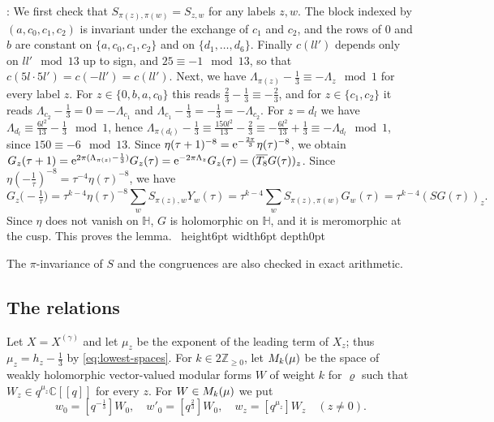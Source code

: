 \documentclass[leqno]{article}
\newcommand{\Cbb}{\ensuremath{\mathbb{C}}}
\let\cal\relax
\newcommand{\cal}{\mathcal}
\newcommand{\Z}{\ensuremath{\mathbb{Z}}}
\renewcommand{\geq}{\ensuremath{\geqslant}}
\newcommand{\qed}{\hfill \vrule height6pt  width6pt depth0pt}
\newcommand{\ovl}{\overline}
\let\i\relax
\newcommand{\i}{\mathrm{i}}
\newcommand{\e}{\mathrm{e}}
\newenvironment{proof}[1][]{\noindent {\it Proof #1} : }{\hbox{~}\qed
\smallskip
}
\numberwithin{equation}{section}
\begin{document}
\begin{proof}
We first check that $S_{\pi(z),\pi(w)} = S_{z,w}$ for any labels $z,w$. The block indexed by $(a,c_0,c_1,c_2)$ is invariant under the exchange of $c_1$ and $c_2$, and the rows of $0$ and $b$ are constant on $\{a,c_0,c_1,c_2\}$ and on $\{d_1,\ldots,d_6\}$. Finally $c(ll')$ depends only on $ll' \mod 13$ up to sign, and $25 \equiv -1 \mod 13$, so that $c(5l \cdot 5l') = c(-ll') = c(ll')$. Next, we have $\Lambda_{\pi(z)}-\frac13 \equiv -\Lambda_z \mod 1$ for every label $z$. For $z \in \{0,b,a,c_0\}$ this reads $\frac23-\frac13 \equiv -\frac23$, and for $z \in \{c_1,c_2\}$ it reads $\Lambda_{c_2}-\frac13 = 0 = -\Lambda_{c_1}$ and $\Lambda_{c_1}-\frac13 = -\frac13 = -\Lambda_{c_2}$. For $z = d_l$ we have $\Lambda_{d_l} \equiv \frac{6l^2}{13}-\frac13 \mod 1$, hence $\Lambda_{\pi(d_l)}-\frac13 \equiv \frac{150l^2}{13}-\frac23 \equiv -\frac{6l^2}{13}+\frac13 \equiv -\Lambda_{d_l} \mod 1$, since $150 \equiv -6 \mod 13$. Since $\eta(\tau+1)^{-8} = \e^{-\frac{2\pi\i}{3}}\eta(\tau)^{-8}$, we obtain $G_z(\tau+1) = \e^{2\pi\i(\Lambda_{\pi(z)}-\frac13)}G_z(\tau) = \e^{-2\pi\i\Lambda_z}G_z(\tau) = (\ovl{T_8}G(\tau))_z$. Since $\eta(-\frac1\tau)^{-8} = \tau^{-4}\eta(\tau)^{-8}$, we have
\[
G_z\big(-\tfrac1\tau\big)
= \tau^{k-4}\eta(\tau)^{-8}\sum_w S_{\pi(z),w}Y_w(\tau)
= \tau^{k-4}\sum_{w} S_{\pi(z),\pi(w)}G_w(\tau)
= \tau^{k-4}(SG(\tau))_z.
\]
Since $\eta$ does not vanish on $\mathbb H$, $G$ is holomorphic on $\mathbb H$, and it is meromorphic at the cusp. This proves the lemma.
\end{proof}

The $\pi$-invariance of $S$ and the congruences are also checked in exact arithmetic.

\subsection{The relations}

Let $X = X^{(\gamma)}$ and let $\mu_z$ be the exponent of the leading term of $X_z$; thus $\mu_z = h_z-\frac13$ by \eqref{eq:lowest-spaces}. For $k \in 2\Z_{\geq 0}$, let $\cal M_k(\mu)$ be the space of weakly holomorphic vector-valued modular forms $W$ of weight $k$ for $\varrho$ such that $W_z \in q^{\mu_z}\Cbb[[q]]$ for every $z$. For $W \in \cal M_k(\mu)$ we put
\begin{equation}
\label{eq:functionals}
w_0 = [q^{-\frac13}]W_0,\quad w'_0 = [q^{\frac23}]W_0,\quad w_z = [q^{\mu_z}]W_z \quad (z \neq 0).
\end{equation}
\end{document}
